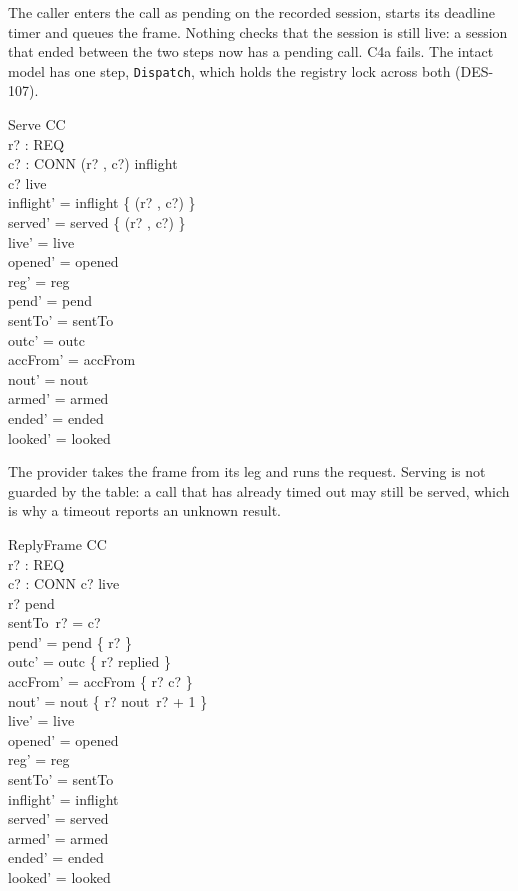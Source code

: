 \documentclass[a4paper,10pt,fleqn]{article}
\begin{document}
The caller enters the call as pending on the recorded session, starts its
deadline timer and queues the frame.  Nothing checks that the session is still
live: a session that ended between the two steps now has a pending call.  C4a
fails.  The intact model has one step, \texttt{Dispatch}, which holds the
registry lock across both (DES-107).

\begin{schema}{Serve}
  \Delta CC \\
  r? : REQ \\
  c? : CONN
\where
  (r? , c?) \in inflight \\
  c? \in live \\
  inflight' = inflight \setminus \{ (r? , c?) \} \\
  served' = served \cup \{ (r? , c?) \} \\
  live' = live \\
  opened' = opened \\
  reg' = reg \\
  pend' = pend \\
  sentTo' = sentTo \\
  outc' = outc \\
  accFrom' = accFrom \\
  nout' = nout \\
  armed' = armed \\
  ended' = ended \\
  looked' = looked
\end{schema}

The provider takes the frame from its leg and runs the request.  Serving is
not guarded by the table: a call that has already timed out may still be
served, which is why a timeout reports an unknown result.

\begin{schema}{ReplyFrame}
  \Delta CC \\
  r? : REQ \\
  c? : CONN
\where
  c? \in live \\
  r? \in pend \\
  sentTo~r? = c? \\
  pend' = pend \setminus \{ r? \} \\
  outc' = outc \oplus \{ r? \mapsto replied \} \\
  accFrom' = accFrom \oplus \{ r? \mapsto c? \} \\
  nout' = nout \oplus \{ r? \mapsto nout~r? + 1 \} \\
  live' = live \\
  opened' = opened \\
  reg' = reg \\
  sentTo' = sentTo \\
  inflight' = inflight \\
  served' = served \\
  armed' = armed \\
  ended' = ended \\
  looked' = looked
\end{schema}
\end{document}
